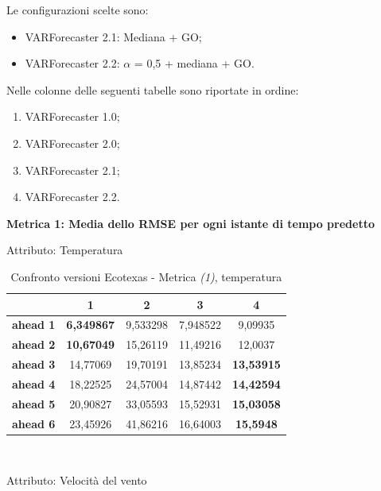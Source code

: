 \documentclass[12pt,a4paper,oneside,openright]{book}
\begin{document}
Le configurazioni scelte sono:
\begin{itemize}
\item VARForecaster 2.1: Mediana + GO;
\item VARForecaster 2.2: $\alpha$ = 0,5 + mediana + GO.
\end{itemize}

Nelle colonne delle seguenti tabelle sono riportate in ordine:
\begin{enumerate}
\item VARForecaster 1.0;
\item VARForecaster 2.0;
\item VARForecaster 2.1;
\item VARForecaster 2.2.
\end{enumerate}

\medskip

\textbf{Metrica 1: Media dello RMSE per ogni istante di tempo predetto} 

\medskip

Attributo: Temperatura \\ 

\begin{table}[H]
\centering
\begin{tabular}{|c|c|c|c|c|}
\hline
& 1 & 2 & 3 & 4 \\
\hline
\textbf{ahead 1} & \textbf{6,349867} & 9,533298 & 7,948522 & 9,09935\\
\hline
\textbf{ahead 2} & \textbf{10,67049} & 15,26119 & 11,49216 & 12,0037\\ 
\hline
\textbf{ahead 3} & 14,77069 & 19,70191 & 13,85234 & \textbf{13,53915}\\
\hline
\textbf{ahead 4} & 18,22525 & 24,57004 & 14,87442 & \textbf{14,42594}\\ 
\hline
\textbf{ahead 5} & 20,90827 & 33,05593 & 15,52931 & \textbf{15,03058}\\
\hline
\textbf{ahead 6} & 23,45926 & 41,86216 & 16,64003 & \textbf{15,5948}\\ 
\hline
\end{tabular} \\
\caption{Confronto versioni Ecotexas - Metrica \textit{(1)}, temperatura}
\end{table} 

\newpage

Attributo: Velocità del vento \\ 
\end{document}
